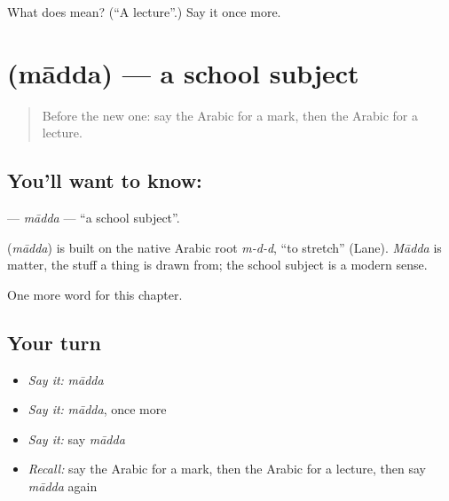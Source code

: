 \begin{tcolorbox}[breakable,colback=teal!4,colframe=teal!35!black,title={Before you move on}]
What does  mean? (\textquotedblleft{}A lecture\textquotedblright{}.) Say it once more.
\end{tcolorbox}
\section[\texorpdfstring{\ar{مادة} (mādda)}{مادة (mādda)}]{ (mādda) — a school subject}

\label{lesson:AR-C252-madda}



\begin{quote}
Before the new one: say the Arabic for a mark, then the Arabic for a lecture.
\end{quote}

\subsection*{You'll want to know: }
\textbf{} — \emph{mādda} — \textquotedblleft{}a school subject\textquotedblright{}.

\begin{cousinweb}
\textbf{} (\emph{mādda}) is built on the native Arabic root \emph{m-d-d}, \textquotedblleft{}to stretch\textquotedblright{} (Lane). \emph{Mādda} is matter, the stuff a thing is drawn from; the school subject is a modern sense.
\end{cousinweb}

\begin{grammarlens}[title={What you've built}]
One more word for this chapter.
\end{grammarlens}

\subsection*{Your turn}
\begin{itemize}
\raggedright
  \item \emph{Say it:} \emph{mādda}
  \item \emph{Say it:} \emph{mādda}, once more
  \item \emph{Say it:} say \emph{mādda}
  \item \emph{Recall:} say the Arabic for a mark, then the Arabic for a lecture, then say \emph{mādda} again
\end{itemize}

